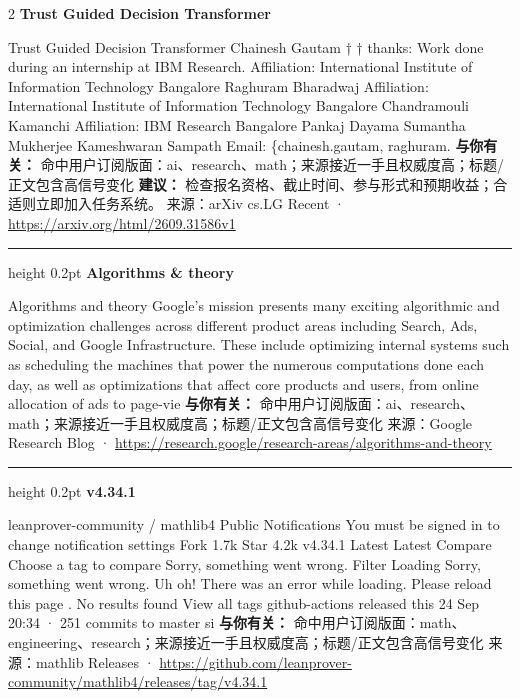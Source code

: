 \documentclass[10.5pt]{ctexart}
\begin{document}
\begin{multicols}{2}
{\large\bfseries Trust Guided Decision Transformer}\par
Trust Guided Decision Transformer Chainesh Gautam † † thanks: Work done during an internship at IBM Research. Affiliation: International Institute of Information Technology Bangalore Raghuram Bharadwaj Affiliation: International Institute of Information Technology Bangalore Chandramouli Kamanchi Affiliation: IBM Research Bangalore Pankaj Dayama Sumantha Mukherjee Kameshwaran Sampath Email: \{chainesh.gautam, raghuram.
\textbf{与你有关：} 命中用户订阅版面：ai、research、math；来源接近一手且权威度高；标题/正文包含高信号变化
\textbf{建议：} 检查报名资格、截止时间、参与形式和预期收益；合适则立即加入任务系统。
{\footnotesize\color{ormuted} 来源：arXiv cs.LG Recent · \url{https://arxiv.org/html/2609.31586v1}}
\vspace{2mm}
\hrule height 0.2pt
\vspace{2mm}
{\large\bfseries Algorithms \& theory}\par
Algorithms and theory Google’s mission presents many exciting algorithmic and optimization challenges across different product areas including Search, Ads, Social, and Google Infrastructure. These include optimizing internal systems such as scheduling the machines that power the numerous computations done each day, as well as optimizations that affect core products and users, from online allocation of ads to page-vie
\textbf{与你有关：} 命中用户订阅版面：ai、research、math；来源接近一手且权威度高；标题/正文包含高信号变化
{\footnotesize\color{ormuted} 来源：Google Research Blog · \url{https://research.google/research-areas/algorithms-and-theory}}
\vspace{2mm}
\hrule height 0.2pt
\vspace{2mm}
{\large\bfseries v4.34.1}\par
leanprover-community / mathlib4 Public Notifications You must be signed in to change notification settings Fork 1.7k Star 4.2k v4.34.1 Latest Latest Compare Choose a tag to compare Sorry, something went wrong. Filter Loading Sorry, something went wrong. Uh oh! There was an error while loading. Please reload this page . No results found View all tags github-actions released this 24 Sep 20:34 · 251 commits to master si
\textbf{与你有关：} 命中用户订阅版面：math、engineering、research；来源接近一手且权威度高；标题/正文包含高信号变化
{\footnotesize\color{ormuted} 来源：mathlib Releases · \url{https://github.com/leanprover-community/mathlib4/releases/tag/v4.34.1}}
\vspace{2mm}

\end{multicols}
\end{document}
